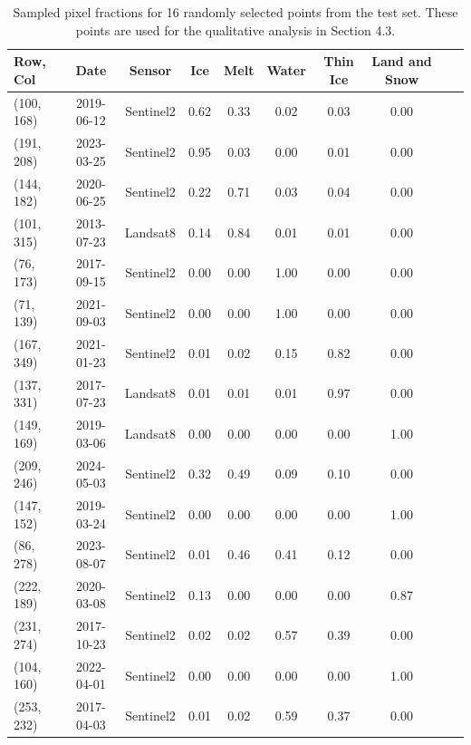 \begin{table}
\caption{Sampled pixel fractions for 16 randomly selected points from the test set. These points are used for the qualitative analysis in Section 4.3.}
\label{tab:sampled_points}
\begin{tabular}{@{\extracolsep{\fill}}lccccccccc}
\toprule
Row, Col & Date & Sensor & Ice & Melt & Water & Thin Ice & Land and Snow \\
\midrule
(100, 168) & 2019-06-12 & Sentinel2 & 0.62 & 0.33 & 0.02 & 0.03 & 0.00 \\
(191, 208) & 2023-03-25 & Sentinel2 & 0.95 & 0.03 & 0.00 & 0.01 & 0.00 \\
(144, 182) & 2020-06-25 & Sentinel2 & 0.22 & 0.71 & 0.03 & 0.04 & 0.00 \\
(101, 315) & 2013-07-23 & Landsat8 & 0.14 & 0.84 & 0.01 & 0.01 & 0.00 \\
(76, 173) & 2017-09-15 & Sentinel2 & 0.00 & 0.00 & 1.00 & 0.00 & 0.00 \\
(71, 139) & 2021-09-03 & Sentinel2 & 0.00 & 0.00 & 1.00 & 0.00 & 0.00 \\
(167, 349) & 2021-01-23 & Sentinel2 & 0.01 & 0.02 & 0.15 & 0.82 & 0.00 \\
(137, 331) & 2017-07-23 & Landsat8 & 0.01 & 0.01 & 0.01 & 0.97 & 0.00 \\
(149, 169) & 2019-03-06 & Landsat8 & 0.00 & 0.00 & 0.00 & 0.00 & 1.00 \\
(209, 246) & 2024-05-03 & Sentinel2 & 0.32 & 0.49 & 0.09 & 0.10 & 0.00 \\
(147, 152) & 2019-03-24 & Sentinel2 & 0.00 & 0.00 & 0.00 & 0.00 & 1.00 \\
(86, 278) & 2023-08-07 & Sentinel2 & 0.01 & 0.46 & 0.41 & 0.12 & 0.00 \\
(222, 189) & 2020-03-08 & Sentinel2 & 0.13 & 0.00 & 0.00 & 0.00 & 0.87 \\
(231, 274) & 2017-10-23 & Sentinel2 & 0.02 & 0.02 & 0.57 & 0.39 & 0.00 \\
(104, 160) & 2022-04-01 & Sentinel2 & 0.00 & 0.00 & 0.00 & 0.00 & 1.00 \\
(253, 232) & 2017-04-03 & Sentinel2 & 0.01 & 0.02 & 0.59 & 0.37 & 0.00 \\
\bottomrule
\end{tabular}
\end{table}

